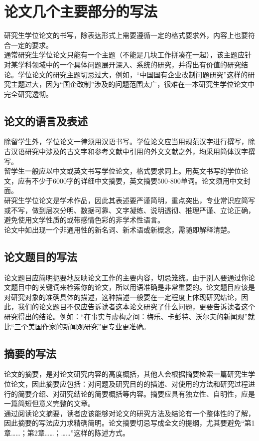 \chapter{论文几个主要部分的写法}

研究生学位论文的书写，除表达形式上需要遵循一定的格式要求外，内容上也要符合一定的要求。\\
通常研究生学位论文只能有一个主题（不能是几块工作拼凑在一起），该主题应针对某学科领域中的一个具体问题展开深入、系统的研究，并得出有价值的研究结论。学位论文的研究主题切忌过大，例如，“中国国有企业改制问题研究”这样的研究主题过大，因为“国企改制”涉及的问题范围太广，很难在一本研究生学位论文中完全研究透彻。

\section{论文的语言及表述}

除留学生外，学位论文一律须用汉语书写。学位论文应当用规范汉字进行撰写，除古汉语研究中涉及的古文字和参考文献中引用的外文文献之外，均采用简体汉字撰写。\\
留学生一般应以中文或英文书写学位论文，格式要求同上。用英文书写的学位论文，应有不少于6000字的详细中文摘要，英文摘要500-800单词。论文须用中文封面。\\
研究生学位论文是学术作品，因此其表述要严谨简明，重点突出，专业常识应简写或不写，做到层次分明、数据可靠、文字凝练、说明透彻、推理严谨、立论正确，避免使用文学性质的或带感情色彩的非学术性语言。\\
论文中如出现一个非通用性的新名词、新术语或新概念，需随即解释清楚。

\section{论文题目的写法}
论文题目应简明扼要地反映论文工作的主要内容，切忌笼统。由于别人要通过你论文题目中的关键词来检索你的论文，所以用语准确是非常重要的。论文题目应该是对研究对象的准确具体的描述，这种描述一般要在一定程度上体现研究结论，因此，我们的论文题目不仅应告诉读者这本论文研究了什么问题，更要告诉读者这个研究得出的结论。例如：“在事实与虚构之间：梅乐、卡彭特、沃尔夫的新闻观”就比“三个美国作家的新闻观研究”更专业更准确。 

\section{摘要的写法}

论文的摘要，是对论文研究内容的高度概括，其他人会根据摘要检索一篇研究生学位论文，因此摘要应包括：对问题及研究目的的描述、对使用的方法和研究过程进行的简要介绍、对研究结论的简要概括等内容。摘要应具有独立性、自明性，应是一篇简短但意义完整的文章。 \\
通过阅读论文摘要，读者应该能够对论文的研究方法及结论有一个整体性的了解，因此摘要的写法应力求精确简明。论文摘要切忌写成全文的提纲，尤其要避免“第1章……；第2章……；……”这样的陈述方式。 

